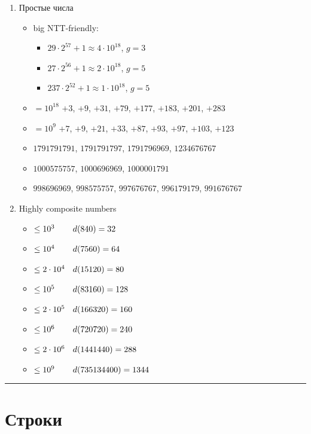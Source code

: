 \documentclass[8pt,a4paper,landscape,twosided]{extarticle}
\begin{document}
\begin{multicols*}{3}
\begin{enumerate}
\item Простые числа
\begin{itemize}
\item big NTT-friendly: \begin{itemize}
    \item $29 \cdot 2^{57} + 1 \approx 4 \cdot 10^{18}$, $g=3$
    \item $27 \cdot 2^{56} + 1 \approx 2 \cdot 10^{18}$, $g=5$
    \item $237 \cdot 2^{52} + 1 \approx 1 \cdot 10^{18}$, $g=5$
\end{itemize}
\item $=10^{18}$ $+3$, $+9$, $+31$, $+79$, $+177$, $+183$, $+201$, $+283$ 
\item $=10^9$ $+7$, $+9$, $+21$, $+33$, $+87$, $+93$, $+97$, $+103$, $+123$
\item $1791791791$, $1791791797$, $1791796969$, $1234676767$
\item $1000575757$, $1000696969$, $1000001791$
\item $998696969$, $998575757$, $997676767$, $996179179$, $991676767$
\end{itemize}

\item Highly composite numbers
\newcommand{\hcn}[2]{$\rlap{$\leq #1\ \ $}\phantom{\leq 2 \cdot 10^6\ \ }\; #2$}
\begin{itemize}
    \item \hcn{10^3}{d(840)=32}
    \item \hcn{10^4}{d(7560)=64}
    \item \hcn{2 \cdot 10^4}{d(15120)=80}
    \item \hcn{10^5}{d(83160)=128}
    \item \hcn{2 \cdot 10^5}{d(166320)=160}
    \item \hcn{10^6}{d(720720)=240}
    \item \hcn{2 \cdot 10^6}{d(1441440)=288}
    \item \hcn{10^9}{d(735134400)=1344}
\end{itemize}

\end{enumerate}

\endgroup






\noindent\rule{\linewidth}{0.15mm}

\section{Строки}


\end{multicols*}
\end{document}
